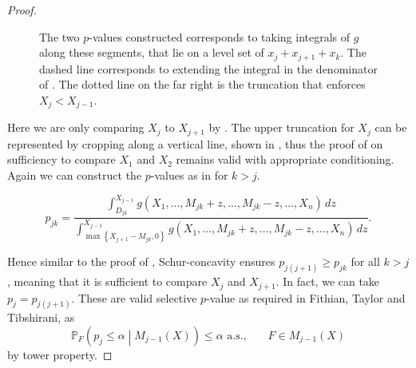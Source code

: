 \documentclass[11pt]{article}
\newcommand{\PP}{\mathbb{P}}
\begin{document}
\begin{proof}
\begin{figure}[htbp]
\begin{center}
\end{center}
\caption{The two $p$-values constructed corresponds to taking integrals of $g$ along these segments, that lie on a level set of $x_j + x_{j+1} + x_k$. The dashed line corresponds to extending the integral in the denominator of . The dotted line on the far right is the truncation that enforces $X_j < X_{j-1}$.}
\label{fig:crop_rays}
\end{figure}

Here we are only comparing $X_j$ to $X_{j+1}$ by . The upper truncation for $X_j$ can be represented by cropping  along a vertical line, shown in , thus the proof of  on sufficiency to compare $X_1$ and $X_2$ remains valid with appropriate conditioning. Again we can construct the $p$-values as in  for $k>j$.

$$p_{jk} = \frac{\int_{D_{jk}}^{X_{j-1}} g\left(X_1, \ldots, M_{jk} + z, \ldots, M_{jk} - z, \ldots, X_n\right) \,dz}{\int_{\max\left\{X_{j+1} - M_{jk}, 0\right\}}^{X_{j-1}} g\left(X_1, \ldots, M_{jk} + z, \ldots, M_{jk} - z, \ldots, X_n\right) \,dz}.$$

Hence similar to the proof of , Schur-concavity ensures $p_{j\left(j+1\right)} \ge p_{jk}$ for all $k>j$, meaning that it is sufficient to compare $X_j$ and $X_{j+1}$. In fact, we can take $p_j = p_{j\left(j+1\right)}$. These are valid selective $p$-value as required in Fithian, Taylor and Tibshirani, as
$$\PP_F \left(p_j \le \alpha \middle| M_{j-1}\left(X\right)\right) \le \alpha \text{ a.s.}, ~~~~~~~~ F \in M_{j-1}\left(X\right)$$
by tower property.


\end{proof}
\end{document}
